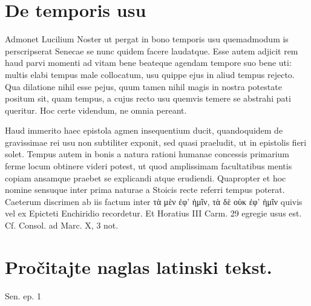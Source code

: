 


\section*{De temporis usu}

Admonet Lucilium Noster ut pergat in bono temporis usu quemadmodum is perscripserat Senecae se nunc quidem facere laudatque. Esse autem adjicit rem haud parvi momenti ad vitam bene beateque agendam tempore suo bene uti: multis elabi tempus male collocatum, usu quippe ejus in aliud tempus rejecto. Qua dilatione nihil esse pejus, quum tamen nihil magis in nostra potestate positum sit, quam tempus, a cujus recto usu quemvis temere se abstrahi pati queritur. Hoc certe videndum, ne omnia pereant.

Haud immerito haec epistola agmen insequentium ducit, quandoquidem de gravissimae rei usu non subtiliter exponit, sed quasi praeludit, ut in epistolis fieri solet. Tempus autem in bonis a natura rationi humanae concessis primarium ferme locum obtinere videri potest, ut quod amplissimam facultatibus mentis copiam ansamque praebet se explicandi atque erudiendi. Quapropter et hoc nomine sensuque inter prima naturae a Stoicis recte referri tempus poterat. Caeterum discrimen ab iis factum inter τὰ μὲν ἐφ' ἡμῖν, τὰ δὲ οὐκ ἐφ' ἡμῖν quivis vel ex Epicteti Enchiridio recordetur. Et Horatius III Carm. 29 egregie usus est. Cf. Consol. ad Marc. X, 3 not.
\newpage

\section*{Pročitajte naglas latinski tekst.}


Sen. ep. 1

\medskip

